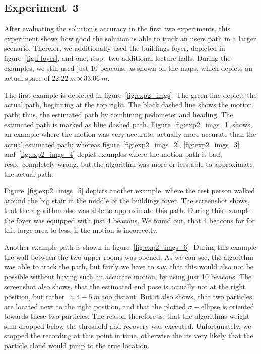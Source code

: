 \subsection*{Experiment~3}
After evaluating the solution's accuracy in the first two experiments, this experiment shows how good the solution is able to track an users path in a larger scenario. Therefor, we additionally used the buildings foyer, depicted in figure~\ref{fig:f-foyer}, and one, resp.\ two additional lecture halls. During the examples, we still used just 10 beacons, as shown on the maps, which depicts an actual space of $22.22~m \times 33.06~m$.

The first example is depicted in figure~\ref{fig:exp2_imgs}. The green line depicts the actual path, beginning at the top right. The black dashed line shows the motion path; thus, the estimated path by combining pedometer and heading. The estimated path is marked as blue dashed path. Figure~\ref{fig:exp2_imgs_1} shows, an example where the motion was very accurate, actually more accurate than the actual estimated path; whereas figure~\ref{fig:exp2_imgs_2}, \ref{fig:exp2_imgs_3} and~\ref{fig:exp2_imgs_4} depict examples where the motion path is bad, resp.\ completely wrong, but the algorithm was more or less able to approximate the actual path.

Figure~\ref{fig:exp2_imgs_5} depicts another example, where the test person walked around the big stair in the middle of the buildings foyer. The screenshot shows, that the algorithm also was able to approximate this path. During this example the foyer was equipped with just 4 beacons. We found out, that 4 beacons for for this large area to less, if the motion is incorrectly.

Another example path is shown in figure~\ref{fig:exp2_imgs_6}. During this example the wall between the two upper rooms was opened. As we can see, the algorithm was able to track the path, but fairly we have to say, that this would also not be possible without having such an accurate motion, by using just 10 beacons. The screenshot also shows, that the estimated end pose is actually not at the right position, but rather $\approx 4-5~m$ too distant. But it also shows, that two particles are located next to the right position, and that the plotted $\sigma-\text{ellipse}$ is oriented towards these two particles.  The reason therefore is, that the algorithms weight sum dropped below the threshold and recovery was executed. Unfortunately, we stopped the recording at this point in time, otherwise the its very likely that the particle cloud would jump to the true location. 


